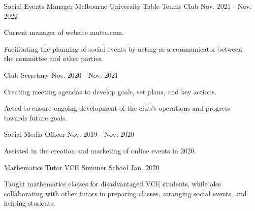 

\begin{cventries}

\cventry
    {Social Events Manager} %
    {Melbourne University Table Tennis Club} %
    {} %
    {Nov. 2021 - Nov. 2022} %
    {
    \begin{cvitems}
    \item Current manager of website muttc.com.
    \item Facilitating the planning of social events by acting as a communicator between the committee and other parties.
    \end{cvitems}
    }

  \cventry
    {Club Secretary} %
    {} %
    {} %
    {Nov. 2020 - Nov. 2021} %
    {
    \begin{cvitems}
    \item Creating meeting agendas to develop goals, set plans, and key actions.
    \item Acted to ensure ongoing development of the club's operations and progress towards future goals.
    \end{cvitems}
    }
    
    \cventry
    {Social Media Officer} %
    {} %
    {} %
    {Nov. 2019 - Nov. 2020} %
    {
    \begin{cvitems}
    \item Assisted in the creation and marketing of online events in 2020.
    \end{cvitems}
    }
    
    \cventry
    {Mathematics Tutor}
    {VCE Summer School}
    {}
    {Jan. 2020}
    {
    \begin{cvitems}
    \item Taught mathematics classes for disadvantaged VCE students, while also collaborating with other tutors in preparing classes, arranging social events, and helping students.
    \end{cvitems}
    }
\end{cventries}
